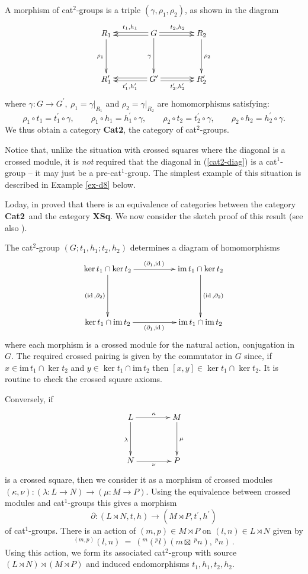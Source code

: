 \documentclass{ws-ijac}
\newcommand{\catCatt}   {{\bf Cat2}}
\newcommand{\catXSq}    {{\bf XSq}}
\newcommand{\id}    {\mathrm{id}\,}
\newcommand{\im}    {\mathrm{im}\,}
\newcommand{\bt}      {\boxtimes}
\begin{document}
\medskip
A morphism of cat$^{2}$-groups is a triple $(\gamma ,\rho_1 ,\rho_2)$,
as shown in the diagram 
\[
\xymatrix@R=40pt@C=40pt 
{ R_1 \ar[d]_{\rho_1} 
	& G \ar[d]_{\gamma} \ar@<-0.4ex>[l]_{t_1,h_1} \ar@<+0.4ex>[l]  
	                    \ar@<+0.4ex>[r]^{t_2,h_2} \ar@<-0.4ex>[r] 
		& R_2 \ar[d]^{\rho_2} \\
  R'_1 
	& G' \ar@<+0.4ex>[l]^{t'_1,h'_1} \ar@<-0.4ex>[l] 
	     \ar@<-0.4ex>[r]_{t'_2,h'_2} \ar@<+0.4ex>[r] 
		& R'_2 
}
\]
\noindent where 
$\gamma : G \to G^{\prime},~ \rho_1 = \gamma|_{R_1}$ 
and $\rho_2 = \gamma|_{R_2}$ are homomorphisms satisfying: 
\[ 
\rho_1 \circ t_1 = t_1^{\prime} \circ \gamma, \qquad 
\rho_1 \circ h_1 = h_1^{\prime} \circ \gamma, \qquad 
\rho_2 \circ t_2 = t_2^{\prime} \circ \gamma, \qquad 
\rho_2 \circ h_2 = h_2^{\prime} \circ \gamma. 
\] 
We thus obtain a category \catCatt, the category of cat$^{2}$-groups. 

Notice that, unlike the situation with crossed squares 
where the diagonal is a crossed module, 
it is \emph{not} required that the diagonal in (\ref{cat2-diag}) 
is a cat$^1$-group -- it may just be a pre-cat$^1$-group. 
The simplest example of this situation  
is described in Example \ref{ex-d8} below. 

Loday, in \cite{Loday} proved that there is an equivalence of categories 
between the category \catCatt\ and the category \catXSq.
We now consider the sketch proof of this result 
(see also \cite{mutlu-porter-2003}). 

The cat$^{2}$-group $(G;t_1,h_1;t_2,h_2)$ determines a diagram of homomorphisms 
\begin{equation} \label{ker-im-diag}
\xymatrix@R=50pt@C=50pt
{ \ker t_1 \cap \ker t_2 \ar[d]_{(\id,\partial_2)} \ar[r]^{(\partial_1,\id)} 
  	  & \im t_1 \cap \ker t_2 \ar[d]^{(\id,\partial_2)} \\ 
  \ker t_1 \cap \im t_2 \ar[r]_{(\partial_1,\id)}  
	  & \im t_1 \cap \im t_2 } 
\end{equation} 
\noindent where each morphism is a crossed module for the natural action, 
conjugation in $G$. 
The required crossed pairing is given by the commutator in $G$ since, 
if $x \in \im t_1 \cap \ker t_2$ and $y \in \ker t_1 \cap \im t_2$ 
then $[x,y] \in \ker t_1 \cap \ker t_2$. 
It is routine to check the crossed square axioms.
	
Conversely, if
\[
\xymatrix@R=40pt@C=40pt
{ L \ar[d]_{\lambda} \ar[r]^{\kappa}  
	  & M \ar[d]^{\mu} \\ 
  N \ar[r]_{\nu} 
	  & P }  
\]
\noindent is a crossed square, 
then we consider it as a morphism of crossed modules 
$(\kappa,\nu) : (\lambda : L \to N) \rightarrow (\mu : M  \to P)$.
Using the equivalence between crossed modules and cat$^{1}$-groups this
gives a morphism
\[
\partial : (L \rtimes N,t,h) \longrightarrow (M \rtimes P, t^{\prime}, h^{\prime})
\]
of cat$^{1}$-groups. 
There is an action of $(m,p) \in M \rtimes P$ on $(l,n) \in L \rtimes N$ 
given by
\[
^{(m,p)}(l,n) ~=~ (^{m}(^{p}l) (m \bt\ ^{p}n),\ ^{p}n)\,.
\] 
Using this action, we form its associated cat$^{2}$-group with source  
$(L \rtimes N) \rtimes (M \rtimes P)$ 
and induced endomorphisms $t_1,h_1,t_2,h_2$. 
\end{document}
